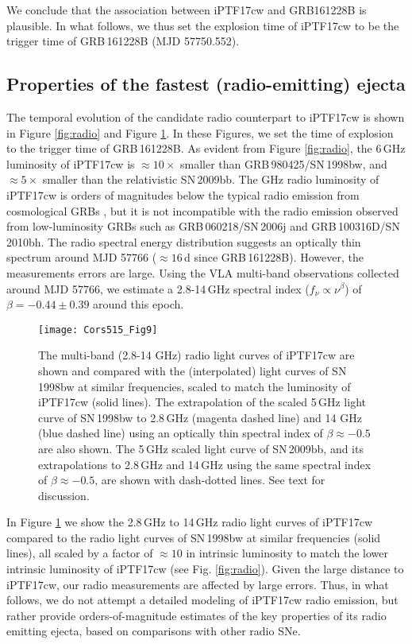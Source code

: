 \documentclass[twocolumn]{emulateapj}
\begin{document}
We conclude that the association between iPTF17cw and GRB161228B is plausible. In what follows, we thus set the explosion time of iPTF17cw to be the trigger time of GRB\,161228B (MJD 57750.552).

\subsection{Properties of the fastest (radio-emitting) ejecta}
\label{radiomodel}
The temporal evolution of the candidate radio counterpart to iPTF17cw is shown in Figure \ref{fig:radio} and Figure \ref{fig:radiolight}. In these Figures, we set the time of explosion to the trigger time of GRB\,161228B. As evident from Figure \ref{fig:radio}, the 6\,GHz luminosity of iPTF17cw is $\approx 10\times$ smaller than GRB\,980425/SN\,1998bw, and $\approx 5\times$ smaller than the relativistic SN\,2009bb. The GHz radio luminosity of iPTF17cw is orders of magnitudes below the typical radio emission from cosmological GRBs \citep[e.g.,][]{Chandra2012}, but it is not incompatible with the radio emission observed from low-luminosity GRBs such as GRB\,060218/SN\,2006j and GRB\,100316D/SN\,2010bh. The radio spectral energy distribution suggests an optically thin spectrum around MJD 57766 ($\approx 16$\,d since GRB\,161228B). However, the measurements errors are large.  Using the VLA multi-band observations collected around MJD 57766, we estimate a 2.8-14\,GHz spectral index ($f_{\nu}\propto \nu^{\beta}$) of $\beta=-0.44\pm0.39$ around this epoch. 

\begin{figure}
\hspace{-0.3cm}
\texttt{[image: Cors515\_Fig9]}
\vspace{-0.2cm}
\caption{The multi-band (2.8-14 GHz) radio light curves of iPTF17cw are shown and compared with the (interpolated) light curves of SN\,1998bw at similar frequencies, scaled to match the luminosity of iPTF17cw (solid lines). The extrapolation of the scaled 5\,GHz light curve of SN\,1998bw to 2.8\,GHz (magenta dashed line) and 14 GHz (blue dashed line) using an optically thin spectral index of $\beta\approx -0.5$ are also shown. The 5\,GHz scaled light curve of SN\,2009bb, and its extrapolations to 2.8\,GHz and 14\,GHz using the same spectral index of $\beta\approx -0.5$, are shown with dash-dotted lines. See text for discussion.\label{fig:radiolight}}
\end{figure}

In Figure \ref{fig:radiolight} we show the  2.8\,GHz to 14\,GHz radio light curves of iPTF17cw compared to the radio light curves of SN\,1998bw at similar frequencies (solid lines), all scaled by a factor of $\approx 10$ in intrinsic luminosity to match the lower intrinsic luminosity of iPTF17cw (see Fig. \ref{fig:radio}). Given the large distance to iPTF17cw, our radio measurements are affected by large errors. Thus, in what follows, we do not attempt a detailed modeling of iPTF17cw radio emission, but rather provide orders-of-magnitude estimates of the key properties of its radio emitting ejecta, based on comparisons with other radio SNe.
\end{document}
